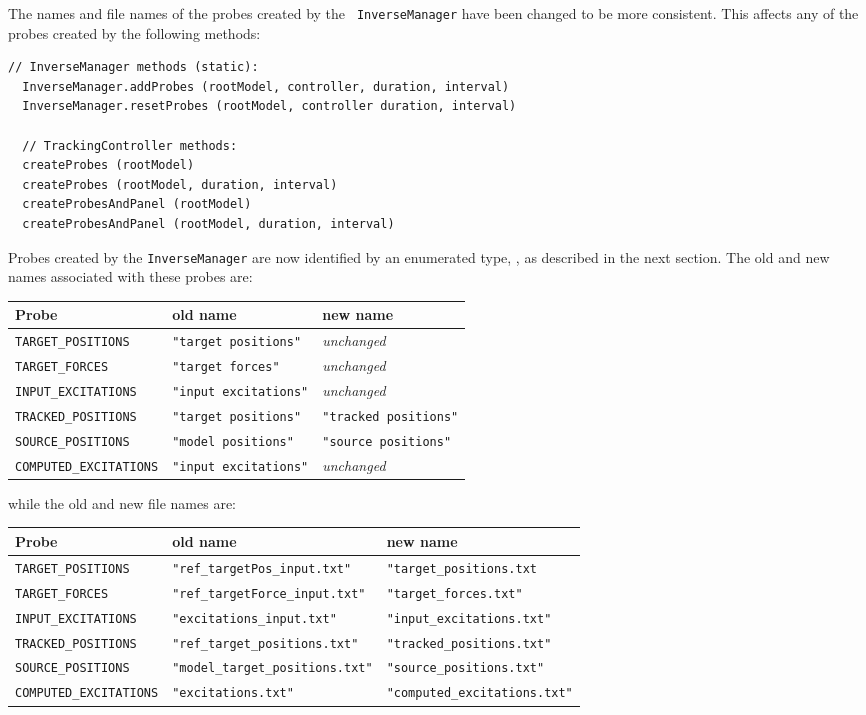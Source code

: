 \documentclass{article}
\begin{document}
The names and file names of the probes created by the {\tt
InverseManager} have been changed to be more consistent. This affects
any of the probes created by the following methods:
%
\begin{lstlisting}[]
  // InverseManager methods (static):
  InverseManager.addProbes (rootModel, controller, duration, interval)
  InverseManager.resetProbes (rootModel, controller duration, interval)

  // TrackingController methods:
  createProbes (rootModel)
  createProbes (rootModel, duration, interval)
  createProbesAndPanel (rootModel)
  createProbesAndPanel (rootModel, duration, interval)
\end{lstlisting}
%
Probes created by the {\tt InverseManager} are now identified by an
enumerated type,
, as
described in the next section. The old and new names associated with
these probes are:
%
\begin{center}
\begin{tabular}{|lll|}
\hline
Probe & old name & new name \\
\hline
{\tt TARGET\_POSITIONS} & {\tt "target positions"} & {\it unchanged} \\
{\tt TARGET\_FORCES} & {\tt "target forces"} & {\it unchanged} \\
{\tt INPUT\_EXCITATIONS} & {\tt "input excitations"} & {\it unchanged} \\
{\tt TRACKED\_POSITIONS} & {\tt "target positions"} & {\tt "tracked positions"} \\
{\tt SOURCE\_POSITIONS} & {\tt "model positions"} & {\tt "source positions"} \\
{\tt COMPUTED\_EXCITATIONS} & {\tt "input excitations"} & {\it unchanged} \\
\hline
\end{tabular}
\end{center}
%
while the old and new file names are:
%
\begin{center}
\begin{tabular}{|lll|}
\hline
Probe & old name & new name \\
\hline
{\tt TARGET\_POSITIONS} & {\tt "ref\_targetPos\_input.txt"} & {\tt "target\_positions.txt} \\
{\tt TARGET\_FORCES} & {\tt "ref\_targetForce\_input.txt"} & {\tt "target\_forces.txt"} \\
{\tt INPUT\_EXCITATIONS} & {\tt "excitations\_input.txt"} & {\tt "input\_excitations.txt"} \\
{\tt TRACKED\_POSITIONS} & {\tt "ref\_target\_positions.txt"} & {\tt "tracked\_positions.txt"} \\
{\tt SOURCE\_POSITIONS} & {\tt "model\_target\_positions.txt"} & {\tt "source\_positions.txt"} \\
{\tt COMPUTED\_EXCITATIONS} & {\tt "excitations.txt"} & {\tt "computed\_excitations.txt"} \\
\hline
\end{tabular}
\end{center}
%
\end{document}
